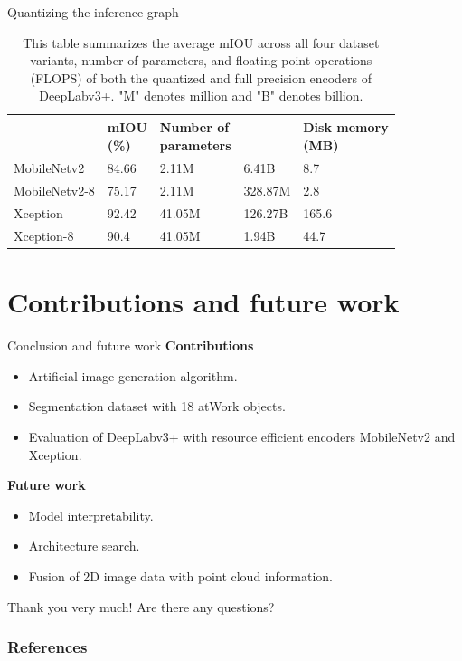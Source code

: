 \documentclass{beamer}
\begin{document}
\begin{frame}{Quantizing the inference graph}

	\begin{table}[h]
		\centering
		\begin{tabular}{|l|l|l|l|l|}
		\hline
		\makecell{\textbf{Encoder}} & \makecell{\textbf{mIOU} \\ \textbf{(\%)}} & \makecell{\textbf{Number of} \\ \textbf{parameters}} & \makecell{\textbf{FLOPS}} & \makecell{\textbf{Disk memory} \\ \textbf{(MB)}} \\ \hline
		MobileNetv2 & 84.66 & 2.11M & 6.41B & 8.7 \\ \hline
		MobileNetv2-8 & 75.17 & 2.11M & 328.87M & 2.8 \\ \hline
		Xception & 92.42 & 41.05M & 126.27B & 165.6 \\ \hline
		Xception-8 & 90.4 & 41.05M & 1.94B & 44.7 \\ \hline
		\end{tabular}
		\captionsetup{justification=centering,margin=0.2cm}
		\caption{This table summarizes the average mIOU across all four dataset variants, number of parameters, and floating point operations (FLOPS) of both the quantized and full precision encoders of DeepLabv3+. "M" denotes million and "B" denotes billion.}
		\label{Table:quantMetrics}
	\end{table}	

\end{frame}


\section{Contributions and future work}

\begin{frame}{Conclusion and future work}
\textbf{Contributions}
	\begin{itemize}
		\item Artificial image generation algorithm.
		\item Segmentation dataset with 18 atWork objects.
		\item Evaluation of DeepLabv3+ with resource efficient encoders MobileNetv2 and Xception.
	\end{itemize}
	
\vspace{5mm}
\textbf{Future work}
	\begin{itemize}
		\item Model interpretability.
		\item Architecture search.
		\item Fusion of 2D image data with point cloud information.
	\end{itemize}

\end{frame}


\begin{frame}{Thank you very much!}
Are there any questions? \\
\end{frame}

\begin{frame}
  \frametitle{References}
  \printbibliography[title={References}]
\end{frame}
\end{document}
